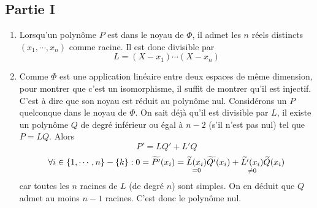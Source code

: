 \subsection*{Partie I}
\begin{enumerate}
 \item Lorsqu'un polynôme $P$ est dans le noyau de $\Phi$, il admet les $n$ réels distincts $(x_1,\cdots,x_n)$ comme racine. Il est donc divisible par
\begin{displaymath}
 L = (X-x_1)\cdots (X-x_n)
\end{displaymath}
\item Comme $\Phi$ est une application linéaire entre deux espaces de même dimension, pour montrer que c'est un isomorphisme, il suffit de montrer qu'il est injectif. C'est à dire que son noyau est réduit au polynôme nul.\newline
Considérons un $P$ quelconque dans le noyau de $\Phi$. On sait déjà qu'il est divisible par $L$, il existe un polynôme $Q$ de degré inférieur ou égal à $n-2$ (s'il n'est pas nul) tel que $P=LQ$. Alors 
\begin{displaymath}
 P' = LQ' + L'Q
\end{displaymath}
\begin{displaymath}
\forall i\in\{1,\cdots,n\}-\{k\}  : 0=\widetilde{P'}(x_i) = 
 \underset{=0}{\widetilde{L}(x_i)}\widetilde{Q'}(x_i) + \underset{\neq 0}{\widetilde{L'}(x_i)}\widetilde{Q}(x_i)\\
\end{displaymath}
car toutes les $n$ racines de $L$ (de degré $n$) sont simples. On en déduit que $Q$ admet au moins $n-1$ racines. C'est donc le polynôme nul.
\end{enumerate}


